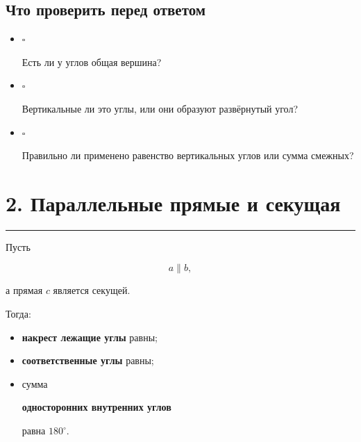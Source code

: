 \documentclass[a4paper,12pt]{article}
\newcommand{\sectionline}{
  \par
  \vspace{0.2em}
  \textcolor{lightline}{\rule{\linewidth}{0.8pt}}
  \par
  \vspace{0.35em}
}
\newcommand{\key}[1]{
  \textcolor{darkaccent}{\textbf{#1}}
}
\newcommand{\checkitem}{
  \textcolor{accent}{$\square$}\,
}
\begin{document}
\subsection*{Что проверить перед ответом}

\begin{itemize}

\item
\checkitem
Есть ли у углов общая вершина?

\item
\checkitem
Вертикальные ли это углы,
или они образуют развёрнутый угол?

\item
\checkitem
Правильно ли применено равенство вертикальных углов
или сумма смежных?

\end{itemize}


\section*{2. Параллельные прямые и секущая}
\sectionline

Пусть

\[
a\parallel b,
\]

а прямая $c$ является секущей.

Тогда:

\begin{itemize}

\item
\key{накрест лежащие углы} равны;

\item
\key{соответственные углы} равны;

\item
сумма
\key{односторонних внутренних углов}
равна $180^\circ$.

\end{itemize}

\begin{center}


\end{center}
\end{document}
